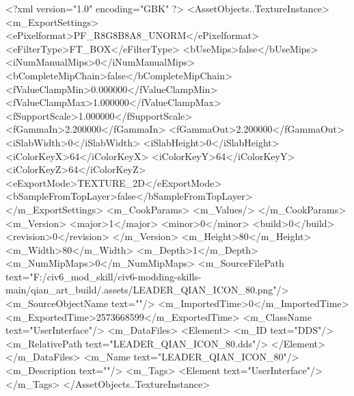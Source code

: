 <?xml version="1.0" encoding="GBK" ?>
<AssetObjects..TextureInstance>
	<m_ExportSettings>
		<ePixelformat>PF_R8G8B8A8_UNORM</ePixelformat>
		<eFilterType>FT_BOX</eFilterType>
		<bUseMips>false</bUseMips>
		<iNumManualMips>0</iNumManualMips>
		<bCompleteMipChain>false</bCompleteMipChain>
		<fValueClampMin>0.000000</fValueClampMin>
		<fValueClampMax>1.000000</fValueClampMax>
		<fSupportScale>1.000000</fSupportScale>
		<fGammaIn>2.200000</fGammaIn>
		<fGammaOut>2.200000</fGammaOut>
		<iSlabWidth>0</iSlabWidth>
		<iSlabHeight>0</iSlabHeight>
		<iColorKeyX>64</iColorKeyX>
		<iColorKeyY>64</iColorKeyY>
		<iColorKeyZ>64</iColorKeyZ>
		<eExportMode>TEXTURE_2D</eExportMode>
		<bSampleFromTopLayer>false</bSampleFromTopLayer>
	</m_ExportSettings>
	<m_CookParams>
		<m_Values/>
	</m_CookParams>
	<m_Version>
		<major>1</major>
		<minor>0</minor>
		<build>0</build>
		<revision>0</revision>
	</m_Version>
	<m_Height>80</m_Height>
	<m_Width>80</m_Width>
	<m_Depth>1</m_Depth>
	<m_NumMipMaps>0</m_NumMipMaps>
	<m_SourceFilePath text="F:/civ6_mod_skill/civ6-modding-skills-main/qian_art_build/.assets/LEADER_QIAN_ICON_80.png"/>
	<m_SourceObjectName text=""/>
	<m_ImportedTime>0</m_ImportedTime>
	<m_ExportedTime>2573668599</m_ExportedTime>
	<m_ClassName text="UserInterface"/>
	<m_DataFiles>
		<Element>
			<m_ID text="DDS"/>
			<m_RelativePath text="LEADER_QIAN_ICON_80.dds"/>
		</Element>
	</m_DataFiles>
	<m_Name text="LEADER_QIAN_ICON_80"/>
	<m_Description text=""/>
	<m_Tags>
		<Element text="UserInterface"/>
	</m_Tags>
</AssetObjects..TextureInstance>

